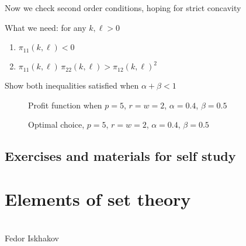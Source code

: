 \documentclass[letterpaper,10pt,english]{jupyterBook}
\begin{document}
\sphinxAtStartPar
Now we check second order conditions, hoping for strict concavity

\sphinxAtStartPar
What we need: for any \(k, \ell > 0\)
\begin{enumerate}
%
\item {} 
\sphinxAtStartPar
\(\pi_{11}(k, \ell) < 0\)

\item {} 
\sphinxAtStartPar
\(\pi_{11}(k, \ell) \, \pi_{22}(k, \ell) >  \pi_{12}(k, \ell)^2\)

\end{enumerate}

\sphinxAtStartPar
{} Show both inequalities satisfied when \(\alpha + \beta < 1\)

\begin{figure}[htbp]
\centering
\capstart

\noindent{}
\caption{Profit function when \(p=5\), \(r=w=2\), \(\alpha=0.4\), \(\beta=0.5\)}\label{\detokenize{02.optimization_intro:id19}}\end{figure}

\begin{figure}[htbp]
\centering
\capstart

\noindent{}
\caption{Optimal choice, \(p=5\), \(r=w=2\), \(\alpha=0.4\), \(\beta=0.5\)}\label{\detokenize{02.optimization_intro:id20}}\end{figure}


\section{Exercises and materials for self study}
\label{\detokenize{02.optimization_intro:exercises-and-materials-for-self-study}}
\sphinxAtStartPar
{\hyperref[\detokenize{02.exercises::doc}]{}}

\sphinxstepscope


\chapter{Elements of set theory}
\label{\detokenize{03.set_theory:elements-of-set-theory}}\label{\detokenize{03.set_theory::doc}}
\sphinxAtStartPar
{}\\
Fedor Iskhakov
\end{document}
